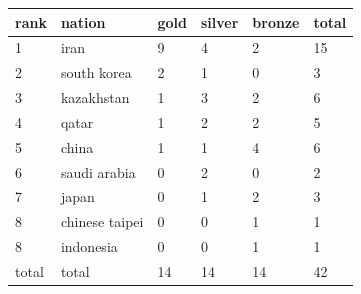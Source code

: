 \documentclass{article}
\begin{document}
\begin{tabular}{llllll}
\toprule
rank & nation & gold & silver & bronze & total \\
\midrule
1 & iran & 9 & 4 & 2 & 15 \\
2 & south korea & 2 & 1 & 0 & 3 \\
3 & kazakhstan & 1 & 3 & 2 & 6 \\
4 & qatar & 1 & 2 & 2 & 5 \\
5 & china & 1 & 1 & 4 & 6 \\
6 & saudi arabia & 0 & 2 & 0 & 2 \\
7 & japan & 0 & 1 & 2 & 3 \\
8 & chinese taipei & 0 & 0 & 1 & 1 \\
8 & indonesia & 0 & 0 & 1 & 1 \\
total & total & 14 & 14 & 14 & 42 \\
\bottomrule
\end{tabular}
\end{document}
